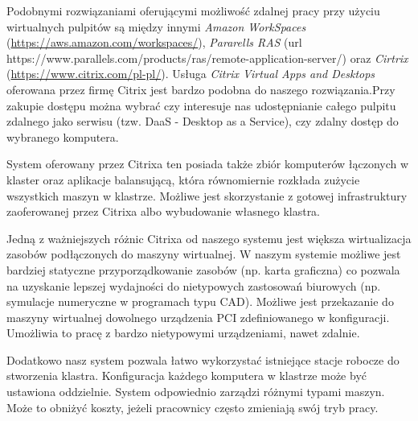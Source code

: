 \documentclass[../wstep.tex]{subfiles}
\begin{document}
Podobnymi rozwiązaniami oferującymi możliwość zdalnej pracy przy użyciu wirtualnych pulpitów są między innymi \textit{Amazon WorkSpaces} (\url{https://aws.amazon.com/workspaces/}), \textit{Pararells RAS} (url {https://www.parallels.com/products/ras/remote-application-server/}) oraz \textit{Cirtrix} (\url{https://www.citrix.com/pl-pl/}).
Usługa \textit{Citrix Virtual Apps and Desktops} \parencite{citrix-daas} oferowana przez firmę Citrix jest bardzo podobna do naszego rozwiązania.Przy zakupie dostępu można wybrać czy interesuje nas udostępnianie całego pulpitu zdalnego jako serwisu (tzw. DaaS - Desktop as a Service), czy zdalny dostęp do wybranego komputera.

System oferowany przez Citrixa ten posiada także zbiór komputerów łączonych w klaster oraz aplikacje balansującą, która równomiernie rozkłada zużycie wszystkich maszyn w klastrze.
Możliwe jest skorzystanie z gotowej infrastruktury zaoferowanej przez Citrixa albo wybudowanie własnego klastra.

Jedną z ważniejszych różnic Citrixa od naszego systemu jest większa wirtualizacja zasobów podłączonych do maszyny wirtualnej.
W naszym systemie możliwe jest bardziej statyczne przyporządkowanie zasobów (np. karta graficzna) co pozwala na uzyskanie lepszej wydajności do nietypowych zastosowań biurowych (np. symulacje numeryczne w programach typu CAD).
Możliwe jest przekazanie do maszyny wirtualnej dowolnego urządzenia PCI zdefiniowanego w konfiguracji.
Umożliwia to pracę z bardzo nietypowymi urządzeniami, nawet zdalnie.

Dodatkowo nasz system pozwala łatwo wykorzystać istniejące stacje robocze do stworzenia klastra.
Konfiguracja każdego komputera w klastrze może być ustawiona oddzielnie. System odpowiednio zarządzi różnymi typami maszyn.
Może to obniżyć koszty, jeżeli pracownicy często zmieniają swój tryb pracy.
\end{document}
